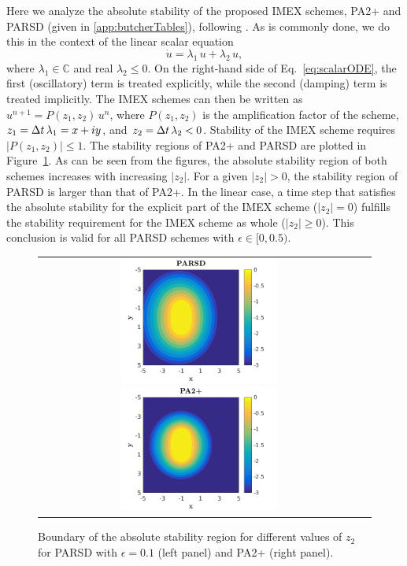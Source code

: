 Here we analyze the absolute stability of the proposed IMEX schemes, PA2+ and PARSD (given in \ref{app:butcherTables}), following \cite{hu_etal_2018}.  
As is commonly done, we do this in the context of the linear scalar equation
\begin{equation}
  \dot{u}=\lambda_{1}\,u+\lambda_{2}\,u,
  \label{eq:scalarODE}
\end{equation}
where $\lambda_{1}\in\mathbb{C}$ and real $\lambda_{2}\le0$.  
On the right-hand side of Eq.~\eqref{eq:scalarODE}, the first (oscillatory) term is treated explicitly, while the second (damping) term is treated implicitly.  
The IMEX schemes can then be written as $u^{n+1} =P(z_{1},z_{2})\,u^{n}$, where $P(z_{1},z_{2})$ is the amplification factor of the scheme, $z_{1}=\Delta t\,\lambda_{1} = x +iy$, and $z_{2} = \Delta t\,\lambda_{2} < 0$.  
Stability of the IMEX scheme requires $|P(z_1,z_2)|\leq 1$.  
The stability regions of PA2+ and PARSD are plotted in Figure~\ref{fig:AbsoluteStability}.  
As can be seen from the figures, the absolute stability region of both schemes increases with increasing $|z_{2}|$.  
For a given $|z_{2}|>0$, the stability region of PARSD is larger than that of PA2+.  
In the linear case, a time step that satisfies the absolute stability for the explicit part of the IMEX scheme ($|z_2| = 0$) fulfills the stability requirement for the IMEX scheme as whole ($|z_2| \geq 0$).  
This conclusion is valid for all PARSD schemes with $\epsilon\in [0,0.5)$.
\begin{figure}[h]
  \centering
  \begin{tabular}{cc}
    \includegraphics[width=0.5\textwidth]{figures/AbsoluteStabilityPARSD}
    \includegraphics[width=0.5\textwidth]{figures/AbsoluteStabilityPA2+}
  \end{tabular}
   \caption{Boundary of the absolute stability region for different values of $z_2$ for PARSD with $\epsilon = 0.1$ (left panel) and PA2+ (right panel).}
  \label{fig:AbsoluteStability}
\end{figure}
